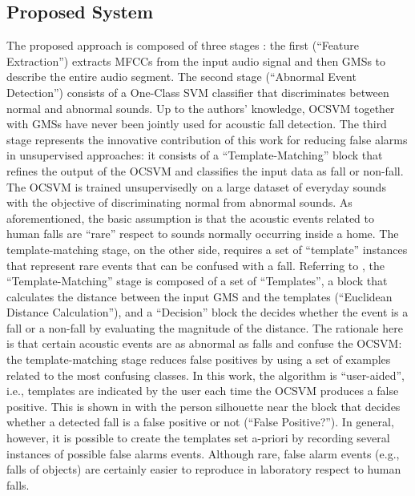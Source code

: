 \subsection{Proposed System}
The proposed approach is composed of three stages : the first (``Feature Extraction'') extracts MFCCs from the input audio signal and then GMSs to describe the entire audio segment. The second stage (``Abnormal Event Detection'') consists of a One-Class SVM classifier that discriminates between normal and abnormal sounds. Up to the authors' knowledge, OCSVM together with GMSs have never been jointly used for acoustic fall detection.  The third stage represents the innovative contribution of this work for reducing false alarms in unsupervised approaches: it consists of a ``Template-Matching'' block that refines the output of the OCSVM and classifies the input data as fall or non-fall. The OCSVM is trained unsupervisedly on a large dataset of everyday sounds with the objective of discriminating normal from abnormal sounds. As aforementioned, the basic assumption is that the acoustic events related to human falls are ``rare'' respect to sounds normally occurring inside a home. The template-matching stage, on the other side, requires a set of ``template'' instances that represent rare events that can be confused with a fall. Referring to , the ``Template-Matching'' stage is composed of a set of ``Templates'', a block that calculates the distance between the input GMS and the templates (``Euclidean Distance Calculation''), and a ``Decision'' block the decides whether the event is a fall or a non-fall by evaluating the magnitude of the distance.  The rationale here is that certain acoustic events are as abnormal as falls and confuse the OCSVM: the template-matching stage reduces false positives by using a set of examples related to the most confusing classes. In this work, the algorithm is ``user-aided'', i.e., templates are indicated by the user each time the OCSVM produces a false positive. This is shown in  with the person silhouette near the block that decides whether a detected fall is a false positive or not (``False Positive?''). In general, however, it is possible to create the templates set a-priori by recording several instances of possible false alarms events. Although rare, false alarm events (e.g., falls of objects) are certainly easier to reproduce in laboratory respect to human falls.

